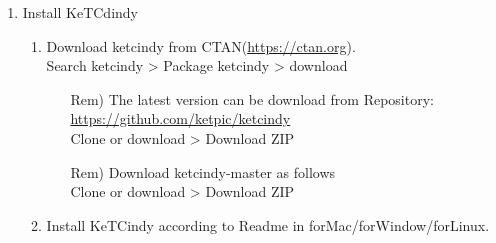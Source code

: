 \documentclass{article}
\begin{document}
\begin{enumerate}[\bf\large 1.]
\item Install KeTCdindy
  \begin{enumerate}[(1)]
  \item Download ketcindy from CTAN(\url{https://ctan.org}).\\
  \hspace*{10mm}Search ketcindy > Pack­age ketcindy > download
    \begin{itemize}
    \item[Rem)]The latest version can be download from Repository:\\
        \hspace*{5mm}\url{https://github.com/ket­pic/ketcindy}\\
        \hspace*{10mm}Clone or download > Download ZIP
    \item[Rem)]Download ketcindy-master as follows\\
    \hspace*{10mm}Clone or download > Download ZIP 
    \end{itemize}
  \item Install KeTCindy according to Readme in forMac/forWindow/forLinux.
  \end{enumerate}
\end{enumerate}
\end{document}
